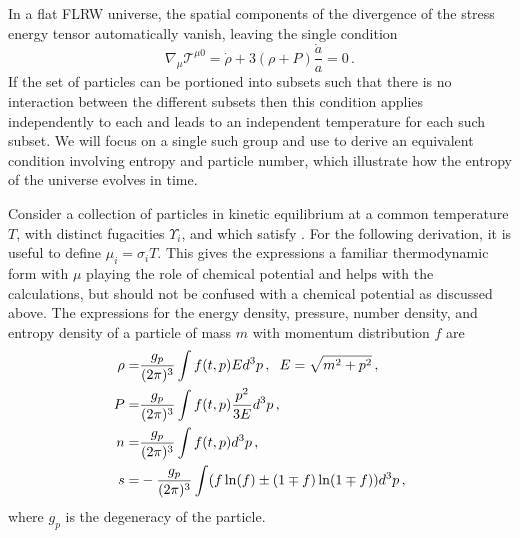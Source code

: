 In a flat FLRW universe, the spatial components of the divergence of the stress energy tensor automatically vanish, leaving the single condition
\begin{equation}\label{stress_energy_eq}
\nabla_\mu \mathcal{T}^{\mu 0}=\dot{\rho}+3\left(\rho+P\right)\frac{\dot{a}}{a}=0\,.
\end{equation}
If the set of particles can be portioned into subsets such that there is no interaction between the different subsets then this condition applies independently to each and leads to an independent temperature for each such subset. We will focus on a single such group and use  to derive an equivalent condition involving entropy and particle number, which illustrate how the entropy of the universe evolves in time. 

Consider a collection of particles in kinetic equilibrium at a common temperature $T$, with distinct fugacities $\Upsilon_i$, and which satisfy . For the following derivation, it is useful to define $\mu_i=\sigma_i T$. This gives the expressions a familiar thermodynamic form with $\mu$ playing the role of chemical potential and helps with the calculations, but should not be confused with a chemical potential as discussed above. The expressions for the energy density, pressure, number density, and entropy density of a particle of mass $m$ with momentum distribution $f$ are
\begin{align}\label{moments}
\rho=&\frac{g_p}{(2\pi)^3}\int f(t,p)Ed^3p\,, \hspace{2mm} E=\sqrt{m^2+p^2}\,,\\
P=&\frac{g_p}{(2\pi)^3}\int f(t,p)\frac{p^2}{3E}d^3p\,,\\
n=&\frac{g_p}{(2\pi)^3}\int f(t,p) d^3p\,,\\
s=&-\frac{g_p}{(2\pi)^3}\int (f\ln(f)\pm(1\mp f)\ln(1\mp f)) d^3p\,,
\end{align}
where $g_p$ is the degeneracy of the particle.


